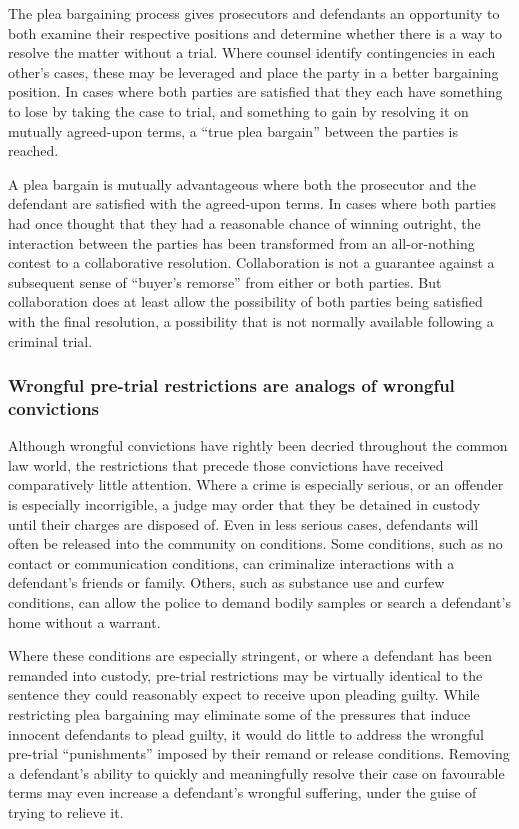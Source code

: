 The plea bargaining process gives prosecutors and defendants an opportunity to both examine their respective positions and determine whether there is a way to resolve the matter without a trial. Where counsel identify contingencies in each other's cases, these may be leveraged and place the party in a better bargaining position. In cases where both parties are satisfied that they each have something to lose by taking the case to trial, and something to gain by resolving it on mutually agreed-upon terms, a ``true plea bargain'' between the parties is reached. 

A plea bargain is mutually advantageous where both the prosecutor and the defendant are satisfied with the agreed-upon terms. In cases where both parties had once thought that they had a reasonable chance of winning outright, the interaction between the parties has been transformed from an all-or-nothing contest to a collaborative resolution. Collaboration is not a guarantee against a subsequent sense of ``buyer's remorse'' from either or both parties. But collaboration does at least allow the possibility of both parties being satisfied with the final resolution, a possibility that is not normally available following a criminal trial.

\subsubsection{Wrongful pre-trial restrictions are analogs of wrongful convictions}

Although wrongful convictions have rightly been decried throughout the common law world, the restrictions that precede those convictions have received comparatively little attention. Where a crime is especially serious, or an offender is especially incorrigible, a judge may order that they be detained in custody until their charges are disposed of. Even in less serious cases, defendants will often be released into the community on conditions. Some conditions, such as no contact or communication conditions, can criminalize interactions with a defendant's friends or family. Others, such as substance use and curfew conditions, can allow the police to demand bodily samples or search a defendant's home without a warrant. 

Where these conditions are especially stringent, or where a defendant has been remanded into custody, pre-trial restrictions may be virtually identical to the sentence they could reasonably expect to receive upon pleading guilty. While restricting plea bargaining may eliminate some of the pressures that induce innocent defendants to plead guilty, it would do little to address the wrongful pre-trial ``punishments'' imposed by their remand or release conditions. Removing a defendant's ability to quickly and meaningfully resolve their case on favourable terms may even increase a defendant's wrongful suffering, under the guise of trying to relieve it.

